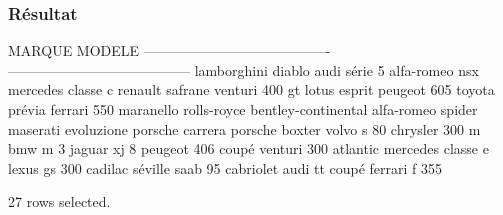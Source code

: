 \documentclass[•]{article}
\begin{document}
\subsubsection{Résultat}
\begin{sql}
    MARQUE                                   MODELE                                 
    ---------------------------------------- ---------------------------------------
    lamborghini                              diablo                                 
    audi                                     série 5                                
    alfa-romeo                               nsx                                    
    mercedes                                 classe c                               
    renault                                  safrane                                
    venturi                                  400 gt                                 
    lotus                                    esprit                                 
    peugeot                                  605                                    
    toyota                                   prévia                                 
    ferrari                                  550 maranello                          
    rolls-royce                              bentley-continental                    
    alfa-romeo                               spider                                 
    maserati                                 evoluzione                             
    porsche                                  carrera                                
    porsche                                  boxter                                 
    volvo                                    s 80                                   
    chrysler                                 300 m                                  
    bmw                                      m 3                                    
    jaguar                                   xj 8                                   
    peugeot                                  406 coupé                              
    venturi                                  300 atlantic                           
    mercedes                                 classe e                               
    lexus                                    gs 300                                 
    cadilac                                  séville                                
    saab                                     95 cabriolet                           
    audi                                     tt coupé                               
    ferrari                                  f 355                                  
    
    27 rows selected.
\end{sql}
\end{document}
